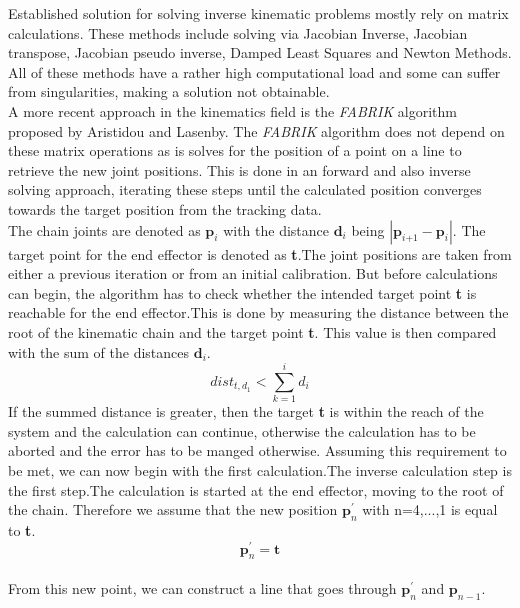 Established solution for solving inverse kinematic problems mostly rely on matrix calculations. These methods include solving via Jacobian Inverse\cite{DavidE.Orin.1984,Wolovich.1984}, Jacobian transpose, Jacobian pseudo inverse\cite{Golub.1965,Dahmen.2008}, Damped Least Squares\cite{Wampler.1986,Nakamura.1986} and Newton Methods. All of these methods have a rather high computational load and some can suffer from singularities, making a solution not obtainable.
\\A more recent approach in the kinematics field is the \textit{FABRIK} algorithm proposed by Aristidou and Lasenby\cite{Aristidou.2011}.
The \textit{FABRIK} algorithm does not depend on these matrix operations as is solves for the position of a point on a line to retrieve the new joint positions. This is done in an forward and also inverse solving approach, iterating these steps until the calculated position converges towards the target position from the tracking data.
\\The chain joints are denoted as $\textbf{p}_{\textit{i}}$ with the distance $\textbf{d}_{i}$ being $|\textbf{p}_{\textit{i+1}}-\textbf{p}_{\textit{i}}|$. The target point for the end effector is denoted as \textbf{t}.The joint positions are taken from either a previous iteration or from an initial calibration. 
But before calculations can begin, the algorithm has to check whether the intended target point \textbf{t} is reachable for the end effector.This is done by measuring the distance between the root of the kinematic chain and the target point \textbf{t}. This value is then compared with the sum of the distances $\textbf{d}_{i}$.
\begin{equation}
 dist_{t,d_{1}}< \sum_{k=1}^{i}{d_{i}}
\end{equation}
If the summed distance is greater, then the target \textbf{t} is within the reach of the system and the calculation can continue, otherwise the calculation has to be aborted and the error has to be manged otherwise.
Assuming this requirement to be met, we can now begin with the first calculation.The inverse calculation step is the first step.The calculation is started at the end effector, moving to the root of the chain.  Therefore we assume that the new position $\textbf{p}_{n}^{'}$ with n=4,...,1 is equal to \textbf{t}.
\begin{equation}
 \textbf{p}_{n}^{'}=\textbf{t}
\end{equation}
\\From this new point, we can construct a line that goes through $\textbf{p}_{n}^{'}$ and $\textbf{p}_{n-1}$.
